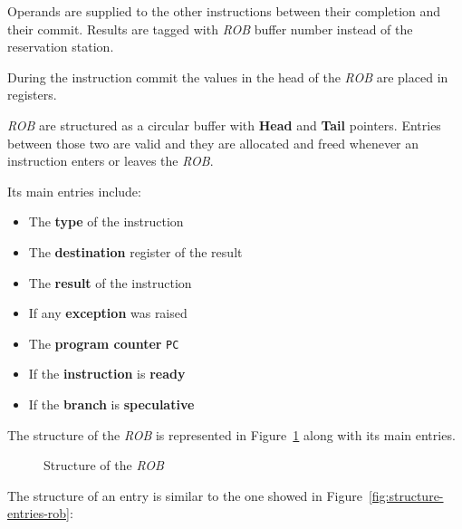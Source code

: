 \documentclass[english]{article}
\begin{document}
Operands are supplied to the other instructions between their completion and their commit.
Results are tagged with \textit{ROB} buffer number instead of the reservation station.

During the instruction commit the values in the head of the \textit{ROB} are placed in registers.

\bigskip
\textit{ROB} are structured as a circular buffer with \textbf{Head} and \textbf{Tail} pointers.
Entries between those two are valid and they are allocated and freed whenever an instruction enters or leaves the \textit{ROB}.

Its main entries include:

\begin{itemize}
  \item The \textbf{type} of the instruction
  \item The \textbf{destination} register of the result
  \item The \textbf{result} of the instruction
  \item If any \textbf{exception} was raised
  \item The \textbf{program counter} \texttt{PC}
  \item If the \textbf{instruction} is \textbf{ready}
  \item If the \textbf{branch} is \textbf{speculative}
\end{itemize}

\bigskip
The structure of the \textit{ROB} is represented in Figure~\ref{fig:structure-of-ROB} along with its main entries.

\begin{figure}[htpb]
  \bigskip
  \centering
  \caption{Structure of the \textit{ROB}}
  \label{fig:structure-of-ROB}
  \bigskip
\end{figure}

The structure of an entry is similar to the one showed in Figure~\ref{fig:structure-entries-rob}:
\end{document}
